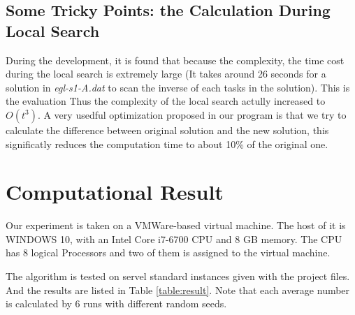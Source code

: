 \documentclass[journal,twoside,web]{ieeecolor}
\begin{document}
\subsection{Some Tricky Points: the Calculation During Local Search}
\label{sec:tricky}
During the development, it is found that because the complexity, the time cost during the local search is extremely large (It takes around 26 seconds for a solution in \textit{egl-s1-A.dat} to scan the inverse of each tasks in the solution). This is the evaluation Thus the complexity of the local search actully increased to $O(t^3)$.
A very usedful optimization proposed in our program is that we try to calculate the difference between original solution and the new solution, this significatly reduces the computation time to about 10\% of the original one.

\section{Computational Result}
Our experiment is taken on a VMWare-based virtual machine. The host of it is WINDOWS 10, with an Intel Core i7-6700 CPU and 8 GB memory. The CPU has 8 logical Processors and two of them is assigned to the virtual machine.\par
The algorithm is tested on servel standard instances given with the project files. And the results are listed in Table \ref{table:result}. Note that each average number is calculated by 6 runs with different random seeds.
\end{document}
